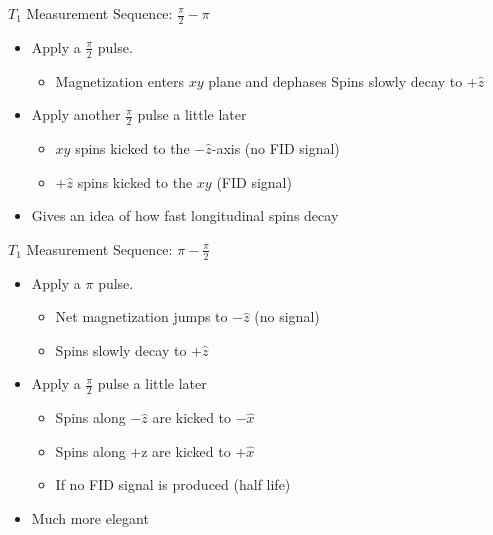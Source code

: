 \documentclass[aspectratio=169,xcolor=dvipsnames]{beamer}
\newcommand{\halfpi}{\frac{\pi}{2}}
\begin{document}
\begin{frame}{$T_1$ Measurement Sequence: $\halfpi - \pi$}
    \begin{itemize}
        \item Apply a $\halfpi$ pulse.
        \begin{itemize}
            \item Magnetization enters $xy$ plane and dephases
            Spins slowly decay to $+\hat{z}$
        \end{itemize}
        \item Apply another $\halfpi$ pulse a little later
        \begin{itemize}
            \item $xy$ spins kicked to the $-\hat{z}$-axis (no FID signal)
            \item $+\hat{z}$ spins kicked to the $xy$ (FID signal)
        \end{itemize}
        \item Gives an idea of how fast longitudinal spins decay
    \end{itemize}
\end{frame}

\begin{frame}{$T_1$ Measurement Sequence: $\pi-\halfpi$}
    \begin{itemize}
        \item Apply a $\pi$ pulse.
        \begin{itemize}
            \item Net magnetization jumps to $-\hat{z}$ (no signal)
            \item Spins slowly decay to $+\hat{z}$
        \end{itemize}
        \item Apply a $\halfpi$ pulse a little later
        \begin{itemize}
            \item Spins along $-\hat{z}$ are kicked to $-\hat{x}$
            \item Spins along +z are kicked to $+\hat{x}$
            \item If no FID signal is produced (half life)
        \end{itemize}
        \item Much more elegant
    \end{itemize}

\end{frame}
\end{document}
